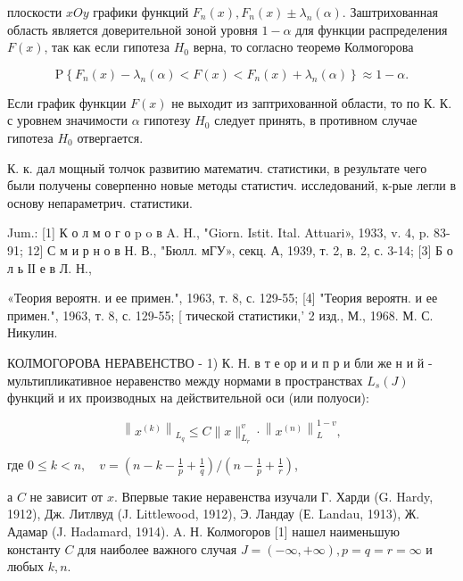 \documentclass[10pt]{article}
\begin{document}
плоскости $x O y$ графики функций $F_{n}(x), F_{n}(x) \pm \lambda_{n}(\alpha)$. Заштрихованная область является доверительной зоной уровня $1-\alpha$ для функции распределения $F(x)$, так как если гипотеза $H_{0}$ верна, то согласно теоремө Колмогорова



\[

\mathrm{P}\left\{F_{n}(x)-\lambda_{n}(\alpha)<F(x)<F_{n}(x)+\lambda_{n}(\alpha)\right\} \approx 1-\alpha .

\]



Если график функции $F(x)$ не выходит из заптрихованной области, то по К. К. с уровнем значимости $\alpha$ гипотезу $H_{0}$ следует принять, в противном случае гипотеза $H_{0}$ отвергается.



К. к. дал мощный толчок развитию математич. статистики, в результате чего были получены соверпенно новые методы статистич. исследований, к-рые легли в основу непараметрич. статистики.



Jum.: [1] К о л м о г о p o в A. H., "Giorn. Istit. Ital. Attuari», 1933, v. 4, p. 83-91; 12] С м и р н о в Н. В., "Бюлл. мГУ», секц. А, 1939, т. 2, в. 2, с. 3-14; [3] Б о л ь ІІ е в Л. Н.,

«Теория вероятн. и ее примен.", 1963, т. 8, с. 129-55; [4] "Теория вероятн. и ее примен.", 1963, т. 8, с. 129-55; [ тической статистики,' 2 изд., М., 1968. М. С. Никулин.



КОЛМОГОРОВА НЕРАВЕНСТВО - 1) К. Н. в т е ор и и п р и бли же н и й - мультипликативное неравенство между нормами в пространствах $L_{s}(J)$ функций и их производных на действительной оси (или полуоси):



\[

\left\|x^{(k)}\right\|_{L_{q}} \leqslant C\|x\|_{L_{r}}^{v} \cdot\left\|x^{(n)}\right\|_{L}^{1-v},

\]



где $0 \leqslant k<n, \quad v=\left(n-k-\frac{1}{p}+\frac{1}{q}\right) /\left(n-\frac{1}{p}+\frac{1}{r}\right)$,



а $C$ не зависит от $x$. Впервые такие неравенства изучали Г. Харди (G. Hardy, 1912), Дж. Литлвуд (J. Littlewood, 1912), Э. Ландау (Е. Landau, 1913), Ж. Адамар (J. Hadamard, 1914). A. Н. Колмогоров [1] нашел наименьшую константу $C$ для наиболее важного случая $J=(-\infty,+\infty), p=q=r=\infty$ и любых $k, n$.
\end{document}
